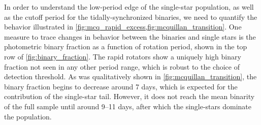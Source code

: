 \documentclass[manuscript]{aastex6}
\begin{document}
\begin{figure*}[htb]
    \centering
    \caption{\emph{Top Left:} The photometric binary fraction as a function of 
        period for the inclusive photometric binary threshold (\(\Delta K <
        -0.2\) mag). The photometric binary fraction
        for the full sample analyzed by \citet{McQuillan14} is shown as the
        dotted line. Error bars are 1-\(\sigma\) binomial confidence
        intervals. \emph{Top Right:} Same as the previous plot, except using
        the more conservative threshold (\(\Delta K < -0.3\) mag). \emph{Bottom
        left:} The period distribution of the photometric binary (solid green) 
        and photometric single (dashed purple) samples, each normalized by the 
        total number of photometric binaries and photometric single stars 
        analyzed by \citet{McQuillan14}, respectively, using the inclusive
        photometric binary threshold. Error bars are 1-\(\sigma\) Poisson 
        confidence intervals. \emph{Bottom Right:}
        Same as the previous plot, except with the more conservative vertical
        displacement threshold.}\label{fig:binary_fraction}
\end{figure*}

In order to understand the low-period edge of the single-star population, as
well as the cutoff period for the tidally-synchronized binaries, we need to
quantify the behavior illustrated in
\cref{fig:mcq_rapid_excess,fig:mcquillan_transition}. One measure to trace
changes in behavior between the binaries and single stars is the photometric
binary fraction as a function of rotation period, shown in the top row of 
\cref{fig:binary_fraction}. The rapid 
rotators show a uniquely high binary fraction not seen in any other period 
range, which is robust to the choice of detection threshold. As was 
qualitatively shown in \cref{fig:mcquillan_transition}, the binary fraction 
begins to decrease around 7 days, which is expected for the contribution of the
single-star tail. However, it does not reach the mean binarity of the full 
sample until around 9--11 days, after which the single-stars dominate the
population.
\end{document}
